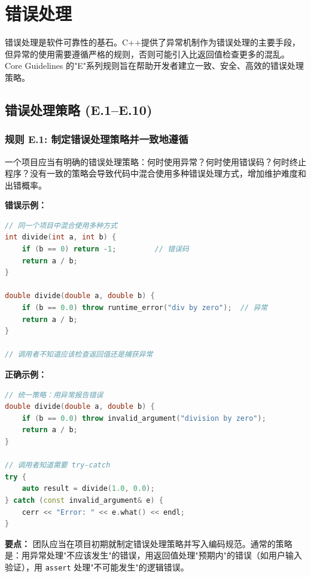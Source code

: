 
\chapter{错误处理}

错误处理是软件可靠性的基石。C++提供了异常机制作为错误处理的主要手段，但异常的使用需要遵循严格的规则，否则可能引入比返回值检查更多的混乱。Core Guidelines 的"E"系列规则旨在帮助开发者建立一致、安全、高效的错误处理策略。

\section{错误处理策略 (E.1--E.10)}

\subsection*{\textbf{规则 E.1:} 制定错误处理策略并一致地遵循}

一个项目应当有明确的错误处理策略：何时使用异常？何时使用错误码？何时终止程序？没有一致的策略会导致代码中混合使用多种错误处理方式，增加维护难度和出错概率。

\textbf{错误示例：}

\begin{lstlisting}[language=C++]
// 同一个项目中混合使用多种方式
int divide(int a, int b) {
    if (b == 0) return -1;         // 错误码
    return a / b;
}

double divide(double a, double b) {
    if (b == 0.0) throw runtime_error("div by zero");  // 异常
    return a / b;
}

// 调用者不知道应该检查返回值还是捕获异常
\end{lstlisting}

\textbf{正确示例：}

\begin{lstlisting}[language=C++]
// 统一策略：用异常报告错误
double divide(double a, double b) {
    if (b == 0.0) throw invalid_argument("division by zero");
    return a / b;
}

// 调用者知道需要 try-catch
try {
    auto result = divide(1.0, 0.0);
} catch (const invalid_argument& e) {
    cerr << "Error: " << e.what() << endl;
}
\end{lstlisting}

\textbf{要点：} 团队应当在项目初期就制定错误处理策略并写入编码规范。通常的策略是：用异常处理"不应该发生"的错误，用返回值处理"预期内"的错误（如用户输入验证），用 \texttt{assert} 处理"不可能发生"的逻辑错误。

